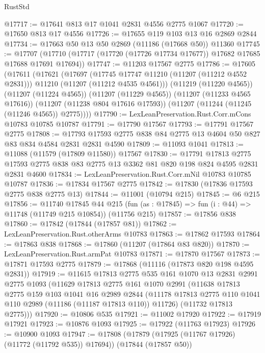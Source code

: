 \begin{lexlean}{RustStd}
\begin{coremodule}
@17717 := @17641 @813 @17 @1041 @2831 @4556 @2775 @1067
@17720 := @17650 @813 @17 @4556
@17726 := @17655 @119 @103 @13 @16 @2869 @2844
@17734 := @17663 @50 @13 @50 @2869 (@11186 (@17668 @50)) @11360
@17745 := @17707
    (@17710 (@17717 (@17720 (@17726 @17734 @17677)) @17682 @17685 @17688 @17691 @17694))
@17747 := @11203 @17567 @2775
@17786 := @17605
    (@17611
      (@17621
        (@17697
          (@17745 @17747 @11210 (@11207 (@11212 @4552 @2831)))
          @11210
          (@11207 (@11212 @4535 @4561)))
        (@11219 (@11220 @4565))
        (@11207 (@11224 @4565))
        (@11207 (@11229 @4565))
        (@11207 (@11233 @4565 @17616))
        (@11207 (@11238 @804 @17616 @17593))
        (@11207 (@11244 (@11245 (@11246 @4565)) @2775))))
@17790 := LexLeanPreservation.Rust.Corr.mCons @10783 @10785 @10787
@17791 := @17790 @17567
@17793 := @17791 @17567 @2775
@17808 := @17793 @17593 @2775 @838 @84 @2775 @13 @4604 @50 @827 @83 @834 @4584 @2831 @2831 @4590
@17809 := @11093 @1041
@17813 := @11088 (@11579 (@17809 @11580)) @17567
@17830 := @17791
    @17813
    @2775
    @17593
    @2775
    @838
    @83
    @2775
    @13
    @3362
    @81
    @820
    @198
    @824
    @4595
    @2831
    @2831
    @4600
@17834 := LexLeanPreservation.Rust.Corr.mNil @10783 @10785 @10787
@17836 := @17834 @17567 @2775
@17842 := @17830 (@17836 @17593 @2775 @838 @2775 @13)
@17844 := @11001 (@10794 @215)
@17845 := @6 @215
@17856 := @11740
    @17845
    @44
    @215
    (fun (as : @17845) => fun (i : @44) => @11748 (@11749 @215 @10854))
    (@11756 @215)
@17857 := @17856 @838
@17860 := @17842 (@17844 (@17857 @81))
@17862 := LexLeanPreservation.Rust.otherArms @10783
@17863 := @17862 @17593
@17864 := @17863 @838
@17868 := @17860 (@11207 (@17864 @83 @820))
@17870 := LexLeanPreservation.Rust.armPat @10783
@17871 := @17870 @17567
@17873 := @17871 @17593 @2775
@17879 := @17868 (@11116 (@17873 @820 @198 @4595 @2831))
@17919 := @11615
    @17813
    @2775
    @535
    @161
    @1070
    @13
    @2831
    @2991
    @2775
    @1093
    (@11629
      @17813
      @2775
      @161
      @1070
      @2991
      (@11638
        @17813
        @2775
        @159
        @103
        @1041
        @16
        @2989
        @2844
        (@11178 @17813 @2775 @110 @1041 @110 @2989 (@11186 (@11187 @17813 @110)) @11726)
        (@11732 @17813 @2775)))
@17920 := @10806 @535
@17921 := @11002 @17920
@17922 := @17919 @17921
@17923 := @10876 @1093
@17925 := @17922 (@11763 @17923)
@17926 := @10900 @1093
@17947 := @17808
    (@17879 (@17925 (@11767 @17926) (@11772 (@11792 @535)) @17694))
    (@17844 (@17857 @50))

\end{coremodule}
\end{lexlean}
